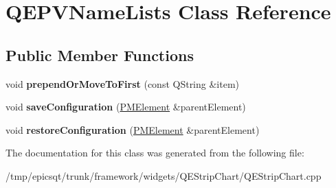 \hypertarget{classQEPVNameLists}{
\section{QEPVNameLists Class Reference}
\label{classQEPVNameLists}
}
\subsection*{Public Member Functions}
\begin{DoxyCompactItemize}
\item 
\hypertarget{classQEPVNameLists_a9aaf284386c6086ae3e9bd415d53ee04}{
void {\bfseries prependOrMoveToFirst} (const QString \&item)}
\label{classQEPVNameLists_a9aaf284386c6086ae3e9bd415d53ee04}

\item 
\hypertarget{classQEPVNameLists_a8c4aa75e3ac91b25f3d06845aefbe8e5}{
void {\bfseries saveConfiguration} (\hyperlink{classPMElement}{PMElement} \&parentElement)}
\label{classQEPVNameLists_a8c4aa75e3ac91b25f3d06845aefbe8e5}

\item 
\hypertarget{classQEPVNameLists_a45396c2345ce27185bcaa01785300e0d}{
void {\bfseries restoreConfiguration} (\hyperlink{classPMElement}{PMElement} \&parentElement)}
\label{classQEPVNameLists_a45396c2345ce27185bcaa01785300e0d}

\end{DoxyCompactItemize}


The documentation for this class was generated from the following file:\begin{DoxyCompactItemize}
\item 
/tmp/epicsqt/trunk/framework/widgets/QEStripChart/QEStripChart.cpp\end{DoxyCompactItemize}
